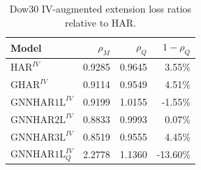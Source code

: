 \begin{table}[H]
\centering
\small
\begin{tabular}{lrrr}
\toprule
Model & \(\rho_M\) & \(\rho_Q\) & \(1-\rho_Q\) \\
\midrule
\(\mathrm{HAR}^{IV}\) & 0.9285 & 0.9645 & 3.55\% \\
\(\mathrm{GHAR}^{IV}\) & 0.9114 & 0.9549 & 4.51\% \\
\(\mathrm{GNNHAR1L}^{IV}\) & 0.9199 & 1.0155 & -1.55\% \\
\(\mathrm{GNNHAR2L}^{IV}\) & 0.8833 & 0.9993 & 0.07\% \\
\(\mathrm{GNNHAR3L}^{IV}\) & 0.8519 & 0.9555 & 4.45\% \\
\(\mathrm{GNNHAR1L}_{Q}^{IV}\) & 2.2778 & 1.1360 & -13.60\% \\
\bottomrule
\end{tabular}
\caption{Dow30 IV-augmented extension loss ratios relative to HAR.}
\label{tab:dow30-iv-loss}
\end{table}
